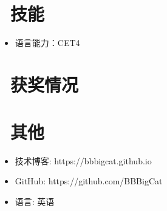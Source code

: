 \documentclass{resume}
\begin{document}
\
\vspace{-2ex}
\begin{onehalfspacing}
\end{onehalfspacing}

\section{\faCogs\ 技能}
\begin{itemize}[parsep=0.5ex]
  \item 语言能力：CET4
 \end{itemize}

\section{\faHeartO\ 获奖情况}

\section{\faInfo\ 其他}
\begin{itemize}[parsep=0.5ex]
  \item 技术博客: https://bbbigcat.github.io
  \item GitHub: https://github.com/BBBigCat
  \item 语言: 英语
\end{itemize}

%
%
\end{document}
